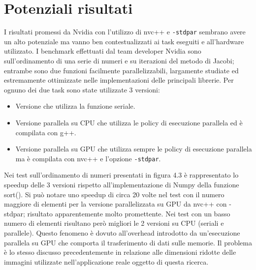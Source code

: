 \documentclass[12pt,a4paper]{report}
\begin{document}
\section{Potenziali risultati}

I risultati promessi da Nvidia con l'utilizzo di nvc++ e \verb|-stdpar| sembrano avere un alto potenziale ma vanno ben contestualizzati ai task eseguiti e all'hardware utilizzato. \newline
I benchmark effettuati dal team developer Nvidia sono sull'ordinamento di una serie di numeri e su iterazioni del metodo di Jacobi; entrambe sono due funzioni facilmente parallelizzabili, largamente studiate ed estremamente ottimizzate nelle implementazioni delle principali librerie.
Per ognuno dei due task sono state utilizzate 3 versioni:
\begin{itemize}
\item Versione che utilizza la funzione seriale.
\item Versione parallela su CPU che utilizza le policy di esecuzione parallela ed è compilata con g++.
\item Versione parallela su GPU che utilizza sempre le policy di esecuzione parallela ma è compilata con nvc++ e l'opzione \verb|-stdpar|.
\end{itemize}

Nei test sull'ordinamento di numeri presentati in figura 4.3 è rappresentato lo speedup delle 3 versioni rispetto all'implementazione di Numpy della funzione sort(). Si può notare uno speedup di circa 20 volte nel test con il numero maggiore di elementi per la versione parallelizzata su GPU da nvc++ con -stdpar; risultato apparentemente molto promettente. Nei test con un basso numero di elementi risultano però migliori le 2 versioni su CPU (seriali e parallele). Questo fenomeno è dovuto all'overhead introdotto da un'esecuzione parallela su GPU che comporta il trasferimento di dati sulle memorie. Il problema è lo stesso discusso precedentemente in relazione alle dimensioni ridotte delle immagini utilizzate nell'applicazione reale oggetto di questa ricerca.
\end{document}
